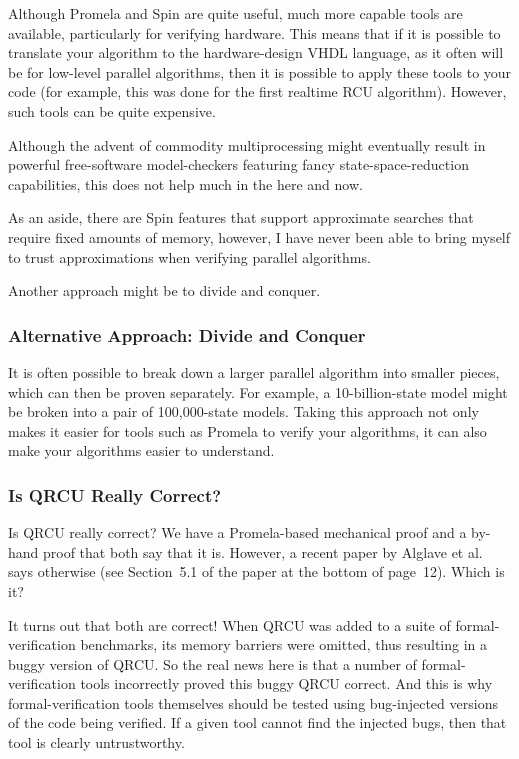 Although Promela and Spin are quite useful,
much more capable tools are available, particularly for verifying
hardware.
This means that if it is possible to translate your algorithm
to the hardware-design VHDL language, as it often will be for
low-level parallel algorithms, then it is possible to apply these
tools to your code (for example, this was done for the first
realtime RCU algorithm).
However, such tools can be quite expensive.

Although the advent of commodity multiprocessing
might eventually result in powerful free-software model-checkers
featuring fancy state-space-reduction capabilities,
this does not help much in the here and now.

As an aside, there are Spin features that support approximate searches
that require fixed amounts of memory, however, I have never been able
to bring myself to trust approximations when verifying parallel
algorithms.

Another approach might be to divide and conquer.

\subsubsection{Alternative Approach: Divide and Conquer}
\label{sec:formal:Alternative Approach: Divide and Conquer}

It is often possible to break down a larger parallel algorithm into
smaller pieces, which can then be proven separately.
For example, a 10-billion-state model might be broken into a pair
of 100,000-state models.
Taking this approach not only makes it easier for tools such as
Promela to verify your algorithms, it can also make your algorithms
easier to understand.

\subsubsection{Is QRCU Really Correct?}
\label{sec:formal:Is QRCU Really Correct?}

Is QRCU really correct?
We have a Promela-based mechanical proof and a by-hand proof that both
say that it is.
However, a recent paper by Alglave et al.~\cite{JadeAlglave2013-cav}
says otherwise (see Section~5.1 of the paper at the bottom of page~12).
Which is it?

It turns out that both are correct!
When QRCU was added to a suite of formal-verification benchmarks,
its memory barriers were omitted, thus resulting in a buggy version
of QRCU.
So the real news here is that a number of formal-verification tools
incorrectly proved this buggy QRCU correct.
And this is why formal-verification tools themselves should be tested
using bug-injected versions of the code being verified.
If a given tool cannot find the injected bugs, then that tool is
clearly untrustworthy.

